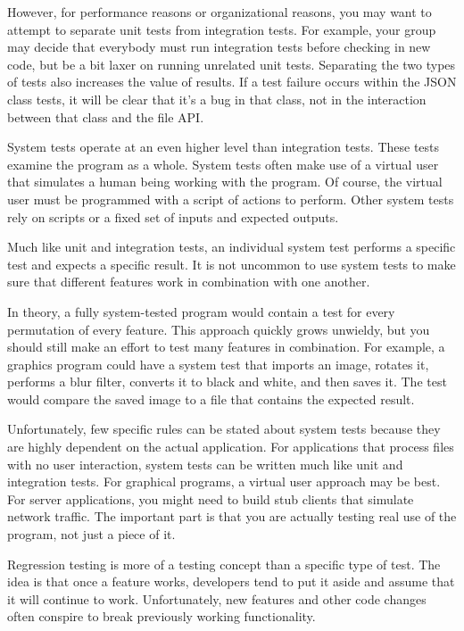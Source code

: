However, for performance reasons or organizational reasons, you may want to attempt to separate unit tests from integration tests. For example, your group may decide that everybody must run integration tests before checking in new code, but be a bit laxer on running unrelated unit tests. Separating the two types of tests also increases the value of results. If a test failure occurs within the JSON class tests, it will be clear that it’s a bug in that class, not in the interaction between that class and the file API.


System tests operate at an even higher level than integration tests. These tests examine the program as a whole. System tests often make use of a virtual user that simulates a human being working with the program. Of course, the virtual user must be programmed with a script of actions to perform. Other system tests rely on scripts or a fixed set of inputs and expected outputs.

Much like unit and integration tests, an individual system test performs a specific test and expects a specific result. It is not uncommon to use system tests to make sure that different features work in combination with one another.

In theory, a fully system-tested program would contain a test for every permutation of every feature. This approach quickly grows unwieldy, but you should still make an effort to test many features in combination. For example, a graphics program could have a system test that imports an image, rotates it, performs a blur filter, converts it to black and white, and then saves it. The test would compare the saved image to a file that contains the expected result.

Unfortunately, few specific rules can be stated about system tests because they are highly dependent on the actual application. For applications that process files with no user interaction, system tests can be written much like unit and integration tests. For graphical programs, a virtual user approach may be best. For server applications, you might need to build stub clients that simulate network traffic. The important part is that you are actually testing real use of the program, not just a piece of it.


Regression testing is more of a testing concept than a specific type of test. The idea is that once a feature works, developers tend to put it aside and assume that it will continue to work. Unfortunately, new features and other code changes often conspire to break previously working functionality.

